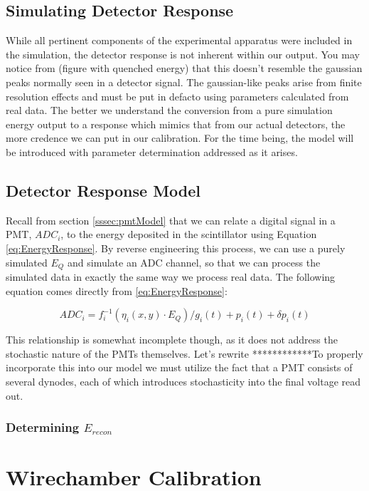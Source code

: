 \subsection{Simulating Detector Response}
While all pertinent components of the experimental apparatus were included
in the simulation, the detector response is not inherent within our
output. You may notice from (figure with quenched energy) that this
doesn't resemble the gaussian peaks normally seen in a detector signal.
The gaussian-like peaks arise from finite resolution effects and
must be put in defacto using parameters calculated
from real data. The better we understand the conversion from a pure simulation
energy output to a response which mimics that from our actual detectors, the
more credence we can put in our calibration. For the time being, the model will
be introduced with parameter determination addressed as it arises. 

\subsection{Detector Response Model}

Recall from section \ref{sssec:pmtModel} that we can relate a digital signal
in a PMT, $ADC_i$, to the energy deposited in the scintillator
using Equation \ref{eq:EnergyResponse}.
By reverse engineering this process, we can use a purely simulated $E_Q$ and
simulate an ADC channel, so that we can process the simulated data in
exactly the same way we process real data. The following equation comes directly
from \ref{eq:EnergyResponse}:

\begin{equation} \label{eq:pmtResponse}
ADC_i = f_i^{-1}\left(\eta_i(x,y) \cdot E_{Q} \right)/g_i(t) + p_i(t) + \delta p_i(t) 
\end{equation}

This relationship is somewhat incomplete though, as it does not address the
stochastic nature of the PMTs themselves. Let's rewrite ************To properly incorporate this into our
model we must utilize the fact that a PMT consists of several dynodes, each of which
introduces stochasticity into the final voltage read out. 

\subsubsection{Determining $E_{recon}$}

\section{Wirechamber Calibration}

